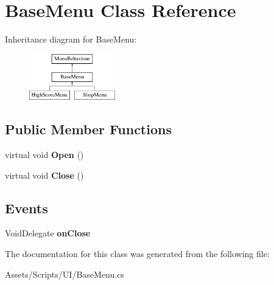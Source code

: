\hypertarget{class_base_menu}{}\section{Base\+Menu Class Reference}
\label{class_base_menu}
Inheritance diagram for Base\+Menu\+:\begin{figure}[H]
\begin{center}
\leavevmode
\includegraphics[height=2.000000cm]{class_base_menu}
\end{center}
\end{figure}
\subsection*{Public Member Functions}
\begin{DoxyCompactItemize}
\item 
virtual void {\bfseries Open} ()\hypertarget{class_base_menu_a630440b00943a12e291e7612d92e569b}{}\label{class_base_menu_a630440b00943a12e291e7612d92e569b}

\item 
virtual void {\bfseries Close} ()\hypertarget{class_base_menu_a6dda5aa6b2280140713243b4fee7cc00}{}\label{class_base_menu_a6dda5aa6b2280140713243b4fee7cc00}

\end{DoxyCompactItemize}
\subsection*{Events}
\begin{DoxyCompactItemize}
\item 
Void\+Delegate {\bfseries on\+Close}\hypertarget{class_base_menu_ade0141e7946a218a72e8b732e5c597b9}{}\label{class_base_menu_ade0141e7946a218a72e8b732e5c597b9}

\end{DoxyCompactItemize}


The documentation for this class was generated from the following file\+:\begin{DoxyCompactItemize}
\item 
Assets/\+Scripts/\+U\+I/Base\+Menu.\+cs\end{DoxyCompactItemize}

